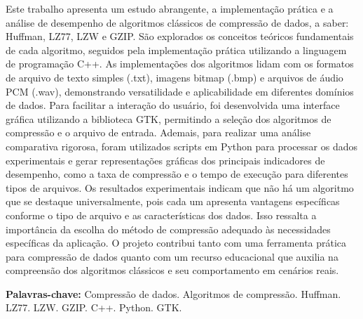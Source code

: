 \documentclass[
	12pt,				%
	openright,			%
	oneside,			%
	a4paper,			%
	english,			%
	french,				%
	spanish,			%
	brazil,				%
	]{lib/abntex2}
\begin{document}

\setlength{\absparsep}{18pt} %
\begin{resumo}
Este trabalho apresenta um estudo abrangente, a implementação prática e a análise de desempenho de algoritmos clássicos de
compressão de dados, a saber: Huffman, LZ77, LZW e GZIP. São explorados os conceitos teóricos fundamentais de cada
algoritmo, seguidos pela implementação prática utilizando a linguagem de programação C++. As implementações dos
algoritmos lidam com os formatos
de arquivo de texto simples (.txt), imagens bitmap (.bmp) e arquivos de áudio PCM (.wav), demonstrando versatilidade e aplicabilidade em diferentes domínios de dados.
Para facilitar a interação do usuário, foi desenvolvida uma interface gráfica utilizando a biblioteca GTK, permitindo a seleção dos algoritmos de compressão e o arquivo de entrada. Ademais, para realizar uma análise comparativa rigorosa, foram utilizados scripts em Python para processar os dados experimentais e gerar representações gráficas dos principais indicadores de desempenho, como a taxa de compressão e o tempo de execução para diferentes tipos de arquivos.
Os resultados experimentais indicam que não há um algoritmo que se destaque universalmente, pois cada um apresenta
vantagens específicas conforme o tipo de arquivo e as características dos dados. Isso ressalta a importância da escolha
do método de compressão adequado às necessidades específicas da aplicação. O projeto contribui tanto com uma ferramenta
prática para compressão de dados quanto com um recurso educacional que auxilia na compreensão dos algoritmos clássicos e
seu comportamento em cenários reais.
        
\textbf{Palavras-chave:} Compressão de dados. Algoritmos de compressão. Huffman. LZ77. LZW. GZIP. C++. Python. GTK.
\end{resumo}
\end{document}
